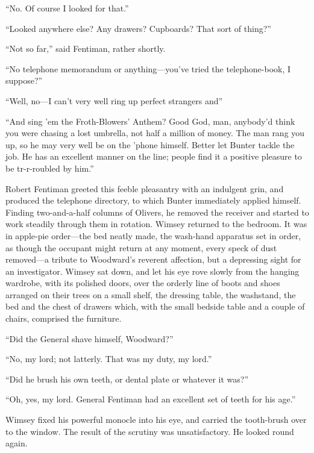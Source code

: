 \enquote{No. Of course I looked for that.}

\enquote{Looked anywhere else? Any drawers? Cupboards? That sort of thing?}

\enquote{Not so far,} said Fentiman, rather shortly.

\enquote{No telephone memorandum or anything\allowbreak---\allowbreak you've tried the telephone-book, I suppose?}

\enquote{Well, no\allowbreak---\allowbreak I can't very well ring up perfect strangers and\longdash}

\enquote{And sing 'em the Froth-Blowers' Anthem? Good God, man, anybody'd think you were chasing a lost umbrella, not half a million of money. The man rang you up, so he may very well be on the 'phone himself. Better let Bunter tackle the job. He has an excellent manner on the line; people find it a positive pleasure to be tr-r-roubled by him.}

Robert Fentiman greeted this feeble pleasantry with an indulgent grin, and produced the telephone directory, to which Bunter immediately applied himself. Finding two-and-a-half columns of Olivers, he removed the receiver and started to work steadily through them in rotation. Wimsey returned to the bedroom. It was in apple-pie order\allowbreak---\allowbreak the bed neatly made, the wash-hand apparatus set in order, as though the occupant might return at any moment, every speck of dust removed\allowbreak---\allowbreak a tribute to Woodward's reverent affection, but a depressing sight for an investigator. Wimsey sat down, and let his eye rove slowly from the hanging wardrobe, with its polished doors, over the orderly line of boots and shoes arranged on their trees on a small shelf, the dressing table, the washstand, the bed and the chest of drawers which, with the small bedside table and a couple of chairs, comprised the furniture.

\enquote{Did the General shave himself, Woodward?}

\enquote{No, my lord; not latterly. That was my duty, my lord.}

\enquote{Did he brush his own teeth, or dental plate or whatever it was?}

\enquote{Oh, yes, my lord. General Fentiman had an excellent set of teeth for his age.}

Wimsey fixed his powerful monocle into his eye, and carried the tooth-brush over to the window. The result of the scrutiny was unsatisfactory. He looked round again.

